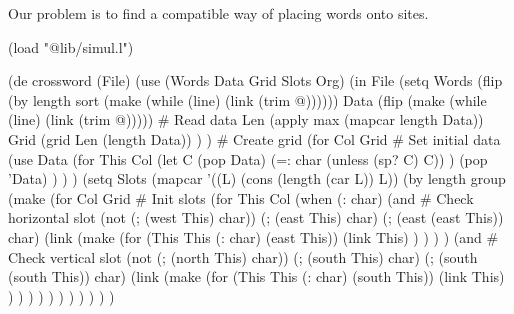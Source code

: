 Our problem is to find a compatible way of placing words onto sites.

\begin{wideverbatim}

(load "@lib/simul.l")

(de crossword (File)
   (use (Words Data Grid Slots Org)
      (in File
         (setq
            Words (flip (by length sort (make (while (line) (link (trim @))))))
            Data (flip (make (while (line) (link (trim @)))))   # Read data
            Len (apply max (mapcar length Data))
            Grid (grid Len (length Data)) ) )            # Create grid
      (for Col Grid  # Set initial data
         (use Data
            (for This Col
               (let C (pop Data)
                  (=: char (unless (sp? C) C)) )
               (pop 'Data) ) ) )
      (setq Slots
         (mapcar
            '((L) (cons (length (car L)) L))
            (by length group
               (make
                  (for Col Grid  # Init slots
                     (for This Col
                        (when (: char)
                           (and  # Check horizontal slot
                              (not (; (west This) char))
                              (; (east This) char)
                              (; (east (east This)) char)
                              (link
                                 (make
                                    (for (This This (: char) (east This))
                                       (link This) ) ) ) )
                           (and  # Check vertical slot
                              (not (; (north This) char))
                              (; (south This) char)
                              (; (south (south This)) char)
                              (link
                                 (make
                                    (for (This This (: char) (south This))
                                       (link This) ) ) ) ) ) ) ) ) ) ) )

\end{wideverbatim}

